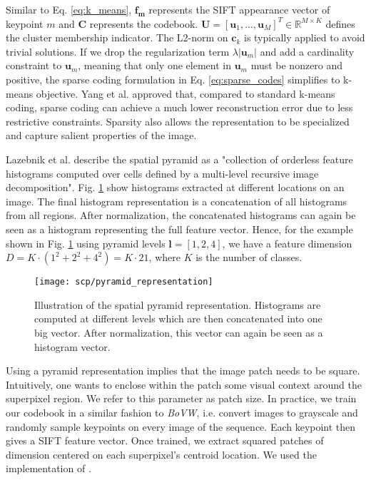 Similar to Eq. \ref{eq:k_means}, $\boldsymbol{f_m}$ represents the SIFT appearance vector of keypoint $m$ and $\boldsymbol{C}$ represents the codebook. $\boldsymbol{U} = [\boldsymbol{u}_1,...,\boldsymbol{u}_M]^T \in \mathbb{R}^{M \times K}$ defines the cluster membership indicator. The L2-norm on $\boldsymbol{c}_k$ is typically applied to avoid trivial solutions. If we drop the regularization term $\lambda |\boldsymbol{u}_m|$ and add a cardinality constraint to $\boldsymbol{u}_m$, meaning that only one element in $\boldsymbol{u}_m$ must be nonzero and positive, the sparse coding formulation in Eq. \ref{eq:sparse_codes} simplifies to k-means objective. Yang et al. \cite{yang09} approved that, compared to standard k-means coding, sparse coding can achieve a much lower reconstruction error due to less restrictive constraints. Sparsity also allows the representation to be specialized and capture salient properties of the image.

Lazebnik et al. \cite{lazebnik09} describe the spatial pyramid as a "collection of orderless feature histograms computed over cells defined by a multi-level recursive image decomposition". Fig. \ref{fig:pyramid_repr} show histograms extracted at different locations on an image. The final histogram representation is a concatenation of all histograms from all regions. After normalization, the concatenated histograms can again be seen as a histogram representing the full feature vector. Hence, for the example shown in Fig. \ref{fig:pyramid_repr} using pyramid levels $\boldsymbol{l} = [1,2,4]$, we have a feature dimension $D = K \cdot (1^2 + 2^2 + 4^2) = K \cdot 21$, where $K$ is the number of classes.

\begin{figure}[htbp]
  \centering
  \texttt{[image: scp/pyramid\_representation]}
  \caption[Spatial pyramid representation]{Illustration of the spatial pyramid representation. Histograms are computed at different levels which are then concatenated into one big vector. After normalization, this vector can again be seen as a histogram vector.}
  \label{fig:pyramid_repr}
\end{figure}

Using a pyramid representation implies that the image patch needs to be square. Intuitively, one wants to enclose within the patch some visual context around the superpixel region. We refer to this parameter as patch size.
In practice, we train our codebook in a similar fashion to \textit{BoVW}, i.e. convert images to grayscale and randomly sample keypoints on every image of the sequence. Each keypoint then gives a SIFT feature vector. Once trained, we extract squared patches of dimension centered on each superpixel's centroid location. We used the implementation of \cite{imdescrip}.

